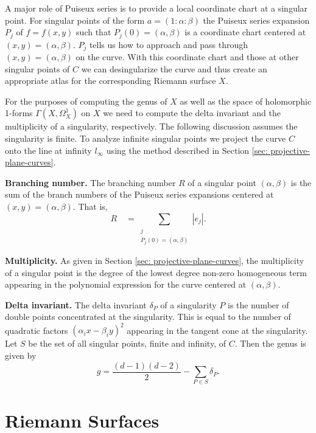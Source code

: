 A major role of Puiseux series is to provide a local coordinate chart at a
singular point. For singular points of the form $a = (1 : \alpha : \beta)$ the
Puiseux series expansion $P_j$ of $f = f(x,y)$ such that $P_j(0) = (\alpha,
\beta)$ is a coordinate chart centered at $(x,y) = (\alpha, \beta)$. $P_j$ tells
us how to approach and pass through $(x,y) = (\alpha, \beta)$ on the curve. With
this coordinate chart and those at other singular points of $C$ we can
desingularize the curve and thus create an appropriate atlas for the
corresponding Riemann surface $X$.

For the purposes of computing the genus of $X$ as well as the space of
holomorphic 1-forms $\Gamma(X,\Omega_X^1)$ on $X$ we need to compute the delta
invariant and the multiplicity of a singularity, respectively. The following
discussion assumes the singularity is finite. To analyze infinite singular
points we project the curve $C$ onto the line at infinity $l_\infty$ using the
method described in Section \ref{sec: projective-plane-curves}.

{\bf Branching number.} The branching number $R$ of a singular point
$(\alpha,\beta)$ is the sum of the branch numbers of the Puiseux series
expansions centered at $(x,y) = (\alpha,\beta)$. That is,
\[
  R \quad = \sum_{\substack{j \\ P_j(0)=(\alpha,\beta)}} |e_j|.
\]

{\bf Multiplicity.} As given in Section \ref{sec: projective-plane-curves}, the
multiplicity of a singular point is the degree of the lowest degree non-zero
homogeneous term appearing in the polynomial expression for the curve centered
at $(\alpha, \beta)$.

{\bf Delta invariant.} The delta invariant $\delta_P$ of a singularity $P$ is
the number of double points concentrated at the singularity. This is equal to
the number of quadratic factors $(\alpha_i x - \beta_i y)^2$ appearing in the
tangent cone at the singularity. Let $S$ be the set of all singular points,
finite and infinity, of $C$. Then the genus is given by
\begin{equation} \label{eqn: genus-formula}
  g = \frac{(d-1)(d-2)}{2} - \sum_{P \in S} \delta_P.
\end{equation}


\section{Riemann Surfaces}\label{sec:background-algebraic-curves}

